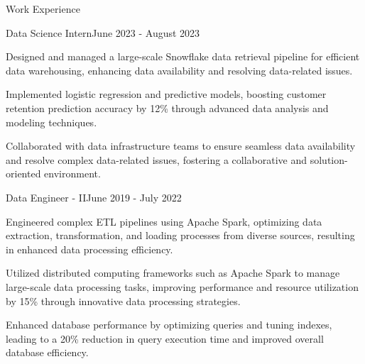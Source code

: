 \documentclass{resume} %
\begin{document}
    \begin{rSection}{Work Experience}
                    \begin{rSubsection}
                {Data Science Intern}{June 2023 - August 2023}
                                    {}
                                {}
                                    \item Designed and managed a large{-}scale Snowflake data retrieval pipeline for efficient data warehousing, enhancing data availability and resolving data{-}related issues.
                                    \item Implemented logistic regression and predictive models, boosting customer retention prediction accuracy by 12\% through advanced data analysis and modeling techniques.
                                    \item Collaborated with data infrastructure teams to ensure seamless data availability and resolve complex data{-}related issues, fostering a collaborative and solution{-}oriented environment.
                            \end{rSubsection}
                    \begin{rSubsection}
                {Data Engineer {-} II}{June 2019 - July 2022}
                                    {}
                                {}
                                    \item Engineered complex ETL pipelines using Apache Spark, optimizing data extraction, transformation, and loading processes from diverse sources, resulting in enhanced data processing efficiency.
                                    \item Utilized distributed computing frameworks such as Apache Spark to manage large{-}scale data processing tasks, improving performance and resource utilization by 15\% through innovative data processing strategies.
                                    \item Enhanced database performance by optimizing queries and tuning indexes, leading to a 20\% reduction in query execution time and improved overall database efficiency.
                            \end{rSubsection}
            \end{rSection}
\end{document}
